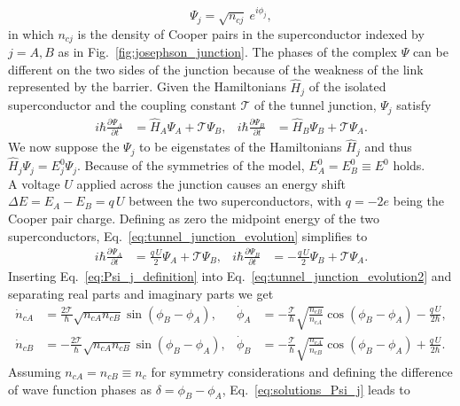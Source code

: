 \documentclass[../main/main.tex]{subfiles}
\begin{document}
\begin{equation} \label{eq:Psi_j_definition}
    \Psi_j=\sqrt{n_{cj}}\ e^{i \phi_j},
\end{equation}
in which $n_{cj}$ is the density of Cooper pairs in the superconductor indexed by $j=A,B$ as in Fig.~\ref{fig:josephson_junction}. The phases of the complex $\Psi$ can be different on the two sides of the junction because of the weakness of the link represented by the barrier. Given the Hamiltonians $\hat{H}_j$ of the isolated superconductor and the coupling constant $\mathcal{T}$ of the tunnel junction, $\Psi_j$ satisfy
\begin{align} \label{eq:tunnel_junction_evolution}
    i \hbar \frac{\partial \Psi_A}{\partial t} &= \hat{H}_A \Psi_A + \mathcal{T} \Psi_B , &
    i \hbar \frac{\partial \Psi_B}{\partial t} &= \hat{H}_B \Psi_B + \mathcal{T} \Psi_A .
\end{align}
We now suppose the $\Psi_j$ to be eigenstates of the Hamiltonians $\hat{H}_j$ and thus $\hat{H}_j \Psi_j = E^0_j \Psi_j$. Because of the symmetries of the model, $E^0_A = E^0_B \equiv E^0$ holds.\\
A voltage $U$ applied across the junction causes an energy shift $\Delta E = E_A - E_B = q\, U$ between the two superconductors, with $q=-2e$ being the Cooper pair charge. Defining as zero the midpoint energy of the two superconductors, Eq.~\eqref{eq:tunnel_junction_evolution} simplifies to
\begin{align} \label{eq:tunnel_junction_evolution2}
    i \hbar \frac{\partial \Psi_A}{\partial t} &= \frac{q\, U}{2} \Psi_A + \mathcal{T} \Psi_B , &
    i \hbar \frac{\partial \Psi_B}{\partial t} &= -\frac{q\, U}{2} \Psi_B + \mathcal{T} \Psi_A .
\end{align}
Inserting Eq.~\eqref{eq:Psi_j_definition} into Eq.~\eqref{eq:tunnel_junction_evolution2} and separating real parts and imaginary parts we get
\begin{align} \label{eq:solutions_Psi_j}
    \dot{n}_{cA} &= \frac{2\mathcal{T}}{\hbar} \sqrt{n_{cA} n_{cB}} \sin{(\phi_B-\phi_A)}, & 
    \dot{\phi}_A &= -\frac{\mathcal{T}}{\hbar} \sqrt{\frac{n_{cB}}{n_{cA}}} \cos{(\phi_B-\phi_A)} - \frac{q\, U}{2\hbar}, \\
    \dot{n}_{cB} &= -\frac{2\mathcal{T}}{\hbar} \sqrt{n_{cA} n_{cB}} \sin{(\phi_B-\phi_A)}, & 
    \dot{\phi}_B &= -\frac{\mathcal{T}}{\hbar} \sqrt{\frac{n_{cA}}{n_{cB}}} \cos{(\phi_B-\phi_A)} + \frac{q\, U}{2\hbar} . \nonumber
\end{align}
Assuming $n_{cA} = n_{cB} \equiv n_c$ for symmetry considerations and defining the difference of wave function phases as $\delta = \phi_B-\phi_A$, Eq.~\eqref{eq:solutions_Psi_j} leads to
\end{document}
